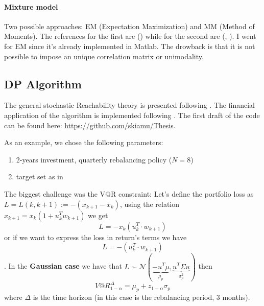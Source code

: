 \documentclass[]{article}
\begin{document}
\paragraph{Mixture model}
Two possible approaches: EM (Expectation Maximization) and MM (Method of Moments). The references for the first are (\cite{McNiel05}) while for the second are (\cite{MM93}, \cite{MM83}). I went for EM since it's already implemented in Matlab. The drowback is that it is not possible to impose an unique correlation matrix or unimodality. 
\subsection{DP Algorithm}
The general stochastic Reachability theory is presented following \cite{Inv}.
The financial application of the algorithm is implemented following \cite{Pola2012}.
The first draft of the code can be found here: 
\url{https://github.com/skiamu/Thesis}.

As an example, we chose the following parameters:
\begin{enumerate}
	\item 2-years investment, quarterly rebalancing policy ($N=8$)
	\item target set as in \cite{PolaNonGaussian}
\end{enumerate}
The biggest challenge was the V@R constraint:
Let's define the portfolio loss as $ L = L(k,k+1):= -(x_{k+1}-x_k) $, using the relation $ x_{k+1} = x_{k}(1+u_k^{T}w_{k+1})$ we get 
\[ L = -x_{k}(u_k^T \cdot w_{k+1})\] or if we want to express the loss in return's terms we have \[ L = -(u_k^T \cdot w_{k+1})\].
In the \textbf{Gaussian case} we have that $ L \sim \mathcal{N}(\underbrace{-u^T\mu}_{\mu_p},\underbrace{u^T\Sigma u}_{\sigma_p^2})$ then \[ V@R^\Delta_{1-\alpha} = \mu_p + z_{1-\alpha} \sigma_p\] where $\Delta$ is the time horizon (in this case is the rebalancing period, 3 months).
\end{document}
